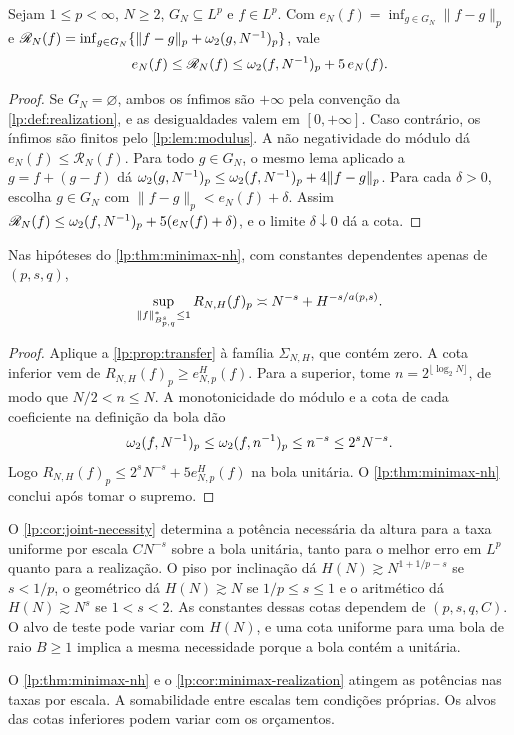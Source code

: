 \documentclass[12pt,a4paper]{article}
\begin{document}
\begin{proposicao}
\label{lp:prop:transfer}
Sejam $1\le p<\infty$, $N\ge2$, $G_N\subseteq L^p$ e $f\in L^p$. Com $e_N(f)=\inf_{g\in G_N}\|f-g\|_p$ e $\mathscr R_N(f)=\inf_{g\in G_N}\{\|f-g\|_p+\omega_2(g,N^{-1})_{p}\}$, vale
\[
 e_N(f)\le\mathscr R_N(f)\le\omega_2(f,N^{-1})_{p}+5\,e_N(f).
\]
\end{proposicao}

\begin{proof}
Se $G_N=\varnothing$, ambos os ínfimos são $+\infty$ pela convenção da \cref{lp:def:realization}, e as desigualdades valem em $[0,+\infty]$. Caso contrário, os ínfimos são finitos pelo \cref{lp:lem:modulus}. A não negatividade do módulo dá $e_N(f)\le\mathscr R_N(f)$. Para todo $g\in G_N$, o mesmo lema aplicado a $g=f+(g-f)$ dá $\omega_2(g,N^{-1})_{p}\le\omega_2(f,N^{-1})_{p}+4\|f-g\|_p$. Para cada $\delta>0$, escolha $g\in G_N$ com $\|f-g\|_p<e_N(f)+\delta$. Assim $\mathscr R_N(f)\le\omega_2(f,N^{-1})_{p}+5(e_N(f)+\delta)$, e o limite $\delta\downarrow0$ dá a cota.
\end{proof}

\begin{corolario}
\label{lp:cor:minimax-realization}
Nas hipóteses do \cref{lp:thm:minimax-nh}, com constantes dependentes apenas de $(p,s,q)$,
\[
 \sup_{\|f\|^*_{B^{s}_{p,q}}\le1}R_{N,H}(f)_p
 \asymp N^{-s}+H^{-s/a(p,s)}.
\]
\end{corolario}

\begin{proof}
Aplique a \cref{lp:prop:transfer} à família $\Sigma_{N,H}$, que contém zero. A cota inferior vem de $R_{N,H}(f)_p\ge e^H_{N,p}(f)$. Para a superior, tome $n=2^{\lfloor\log_2N\rfloor}$, de modo que $N/2<n\le N$. A monotonicidade do módulo e a cota de cada coeficiente na definição da bola dão
\[
 \omega_2(f,N^{-1})_{p}\le\omega_2(f,n^{-1})_{p}\le n^{-s}\le2^sN^{-s}.
\]
Logo $R_{N,H}(f)_p\le 2^sN^{-s}+5e^H_{N,p}(f)$ na bola unitária. O \cref{lp:thm:minimax-nh} conclui após tomar o supremo.
\end{proof}

\begin{observacao}
\label{lp:obs:floor-closure}
O \cref{lp:cor:joint-necessity} determina a potência necessária da altura para a taxa uniforme por escala $CN^{-s}$ sobre a bola unitária, tanto para o melhor erro em $L^p$ quanto para a realização. O piso por inclinação dá $H(N)\gtrsim N^{1+1/p-s}$ se $s<1/p$, o geométrico dá $H(N)\gtrsim N$ se $1/p\le s\le1$ e o aritmético dá $H(N)\gtrsim N^s$ se $1<s<2$. As constantes dessas cotas dependem de $(p,s,q,C)$. O alvo de teste pode variar com $H(N)$, e uma cota uniforme para uma bola de raio $B\ge1$ implica a mesma necessidade porque a bola contém a unitária.

O \cref{lp:thm:minimax-nh} e o \cref{lp:cor:minimax-realization} atingem as potências nas taxas por escala. A somabilidade entre escalas tem condições próprias. Os alvos das cotas inferiores podem variar com os orçamentos.
\end{observacao}
\end{document}
